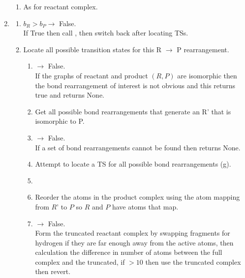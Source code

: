 \documentclass[../../main.tex]{subfiles}
\begin{document}
\begin{enumerate}
\begin{enumerate}
		\item {}
		As for reactant complex.
	\end{enumerate}
	
	
	\item {}
	\begin{enumerate}
		\item $b_R > b_P \rightarrow$ False.\\ 
		If True then call ,
		then switch back after locating TSs.
		
		\item {}
		Locate all possible transition states for this R $\rightarrow$ P
		rearrangement.
		
		\begin{enumerate}
			\item {} $\rightarrow$ False.\\
			If the graphs of reactant and product $(R, P)$ are
			isomorphic then the bond rearrangement of
			interest is not obvious and this returns true and
			 returns None.
			
			\item {}
			Get all possible bond rearrangements that generate an R’ that is isomorphic to P.
			
			\item {} $\rightarrow$ False.\\
			If a set of bond rearrangements cannot be found then  returns None.
			
			\item {}
			Attempt to locate a TS for all possible bond rearrangements (g). 
			
			\item {}
			
			\item {}
			Reorder the atoms in the product complex using
			the atom mapping from $R’$ to $P$ so $R$ and $P$ have
			atoms that map.
			
			\item {} $\rightarrow$ False.\\
			Form the truncated reactant complex by
			swapping fragments for hydrogen if they are
			far enough away from the active atoms, then
			calculation the difference in number of atoms
			between the full complex and the truncated, if          
			$> 10$ then use the truncated complex then
			revert.
			

\end{enumerate}
\end{enumerate}
\end{enumerate}
\end{document}

